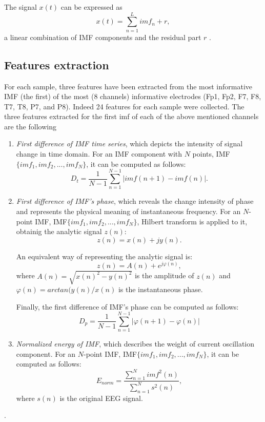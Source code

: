 \documentclass[10pt,journal,A4paper,compsoc,epsfig]{IEEEtran}
\begin{document}
The signal $x(t)$ can be expressed as
\begin{equation}
x(t) = \sum_{n=1}^L{imf_n + r},
\end{equation}
a linear combination of IMF components and the residual part $r$ \cite{zhuang2017emotion}.

\subsection{Features extraction}
For each sample, three features have been extracted from the most informative IMF (the first) of the most (8 channels) informative electrodes (Fp1, Fp2, F7, F8, T7, T8, P7, and P8). Indeed 24 features for each sample were collected.
The three features extracted for the first imf of each of the above mentioned channels are the following \cite{zhuang2017emotion}
\begin{enumerate}
\item \textit{First difference of IMF time series}, which depicts the intensity of signal change in time domain. For an IMF component with $N$ points, IMF$\{imf_1, imf_2, ..., imf_N\}$, it can be computed as follows:
\begin{equation}
D_t = \frac{1}{N-1}\sum_{n=1}^{N-1}{|imf(n+1) - imf(n)|}.
\end{equation}

\item \textit{First difference of IMF's phase}, which reveals the change intensity of phase and represents the physical meaning of instantaneous frequency. For an $N$-point IMF, IMF$\{imf_1, imf_2, ..., imf_N\}$, Hilbert transform is applied to it, obtainig the analytic signal $z(n)$:
\begin{equation}
z(n) = x(n) + jy(n).
\end{equation}

An equivalent way of representing the analytic signal is:
\begin{equation}
z(n) = A(n) + e^{j\varphi(n)},
\end{equation}
where $A(n) = \sqrt{x(n)^2 - y(n)^2}$ is the amplitude of $z(n)$ and $\varphi(n) = arctan(y(n)/x(n)$ is the instantaneous phase.

Finally, the first difference of IMF's phase can be computed as follows:
\begin{equation}
D_p = \frac{1}{N-1}\sum_{n=1}^{N-1}{|\varphi(n+1) - \varphi(n)|}
\end{equation}

\item \textit{Normalized energy of IMF}, which describes the weight of current oscillation component. For an $N$-point IMF, IMF$\{imf_1, imf_2, ..., imf_N\}$, it can be computed as follows:
\begin{equation}
E_{norm} = \frac{\sum_{n=1}^N{imf^2(n)}}{\sum_{n=1}^N{s^2(n)}},
\end{equation}
where $s(n)$ is the original EEG signal.
\end{enumerate}.
\end{document}
